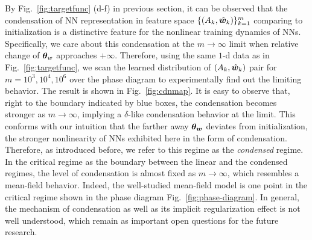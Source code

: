 \documentclass{article}
\begin{document}
By Fig.~\ref{fig:targetfunc} (d-f) in previous section, it can be observed that the condensation of NN representation in feature space $\{(A_k,\hat{\bm{w}}_k)\}_{k=1}^m$ comparing to initialization is a distinctive feature for the nonlinear training dynamics of NNs. Specifically, we care about this condensation at the $m\to\infty$ limit when relative change of $\bm{\theta}_{w}$ approaches $+\infty$. Therefore, using the same $1$-d data as in Fig.~\ref{fig:targetfunc}, we scan the learned distribution of $(A_k,\hat{\bm{w}}_k)$ pair for $m=10^3,10^4,10^6$ over the phase diagram to experimentally find out the limiting behavior. The result is shown in Fig.~\ref{fig:cdnmap}. It is easy to observe that, right to the boundary indicated by blue boxes, the condensation becomes stronger as $m\to\infty$, implying a $\delta$-like condensation behavior at the limit. This conforms with our intuition that the farther away $\bm{\theta}_{\bm{w}}$ deviates from initialization, the stronger nonlinearity of NNs exhibited here in the form of condensation. Therefore, as introduced before, we refer to this regime as the \emph{condensed} regime. In the critical regime as the boundary between the linear and the condensed regimes, the level of condensation is almost fixed as $m\to\infty$, which resembles a mean-field behavior. Indeed, the well-studied mean-field model is one point in the critical regime shown in the phase diagram Fig.~\ref{fig:phase-diagram}. In general, the mechanism of condensation as well as its implicit regularization effect is not well understood, which remain as important open questions for the future research.
\end{document}
